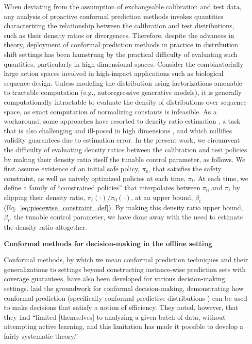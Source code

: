 When deviating from the assumption of exchangeable calibration and test data, any analysis of proactive conformal prediction methods invokes quantities characterizing the relationship between the calibration and test distributions, such as their density ratios or divergences.
Therefore, despite the advances in theory, deployment of conformal prediction methods in practice in distribution shift settings has been hamstrung by the practical difficulty of evaluating such quantities, particularly in high-dimensional spaces.
Consider the combinatorially large action spaces involved in high-impact applications such as biological sequence design.
Unless modeling the distribution using factorizations amenable to tractable computation (e.g., autoregressive generative models), it is generally computationally intractable to evaluate the density of distributions over sequence space, as exact computation of normalizing constants is infeasible.
As a workaround, some approaches have resorted to density ratio estimation \cite{stanton2023bayesian, Laghuvarapu2023, fannjiang2025, correia2025neurips}, a task that is also challenging and ill-posed in high dimensions \cite{rhodes2020}, and which nullifies validity guarantees due to estimation error.
In the present work, we circumvent the difficulty of evaluating density ratios between the calibration and test policies by making their density ratio itself the tunable control parameter, as follows. 
We first assume existence of an initial safe policy, $\pi_0$, that satisfies the safety constraint, as well as naively optimized policies at each time, $\pi_t$.
At each time, we define a family of ``constrained policies'' that interpolates between $\pi_0$ and $\pi_t$ by clipping their density ratio, $\pi_t(\cdot) / \pi_0(\cdot)$, at an upper bound, $\beta_t$ (Eq.~\eqref{eq:piecewise_constraint_def}).
By making this density ratio upper bound, $\beta_t$, the tunable control parameter, we have done away with the need to estimate the density ratio altogether.



\textbf{Conformal methods for decision-making in the offline setting}

Conformal methods, by which we mean conformal prediction techniques and their generalizations to settings beyond constructing instance-wise prediction sets with coverage guarantees, have also been developed for various decision-making settings.
\citet{vovk2018conformal} laid the groundwork for conformal decision-making, demonstrating how conformal prediction (specifically conformal predictive distributions \citep{vovk2017nonparametric}) can be used to make decisions that satisfy a notion of efficiency.
They noted, however, that they had ``limited [themselves] to analyzing a given batch of data, without attempting active learning, and this limitation has made it possible to develop a fairly systematic theory.''


